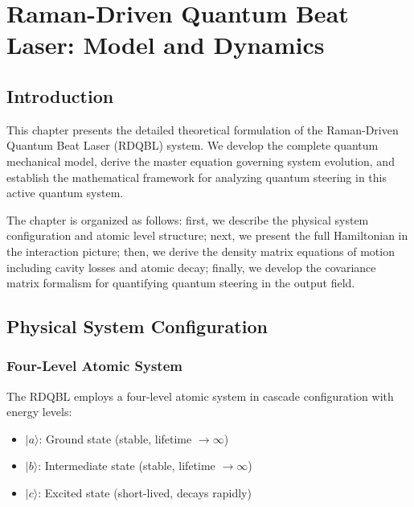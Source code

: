 
\chapter{Raman-Driven Quantum Beat Laser: Model and Dynamics}
\label{chp3}
\newpage

\section{Introduction}

This chapter presents the detailed theoretical formulation of the Raman-Driven Quantum Beat Laser (RDQBL) system. We develop the complete quantum mechanical model, derive the master equation governing system evolution, and establish the mathematical framework for analyzing quantum steering in this active quantum system.

The chapter is organized as follows: first, we describe the physical system configuration and atomic level structure; next, we present the full Hamiltonian in the interaction picture; then, we derive the density matrix equations of motion including cavity losses and atomic decay; finally, we develop the covariance matrix formalism for quantifying quantum steering in the output field.

\section{Physical System Configuration}

\subsection{Four-Level Atomic System}

The RDQBL employs a four-level atomic system in cascade configuration with energy levels:
\begin{itemize}
	\item $|a\rangle$: Ground state (stable, lifetime $\rightarrow \infty$)
	\item $|b\rangle$: Intermediate state (stable, lifetime $\rightarrow \infty$)
	\item $|c\rangle$: Excited state (short-lived, decays rapidly)
\end{itemize}


